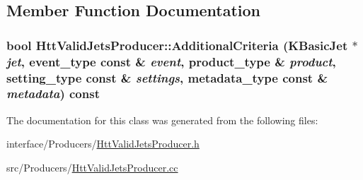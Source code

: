 \subsection{Member Function Documentation}
\hypertarget{classHttValidJetsProducer_a368f84a43f5e68388b5eee1a9d6670d4}{
\subsubsection[{AdditionalCriteria}]{\setlength{\rightskip}{0pt plus 5cm}bool HttValidJetsProducer::AdditionalCriteria (KBasicJet $\ast$ {\em jet}, \/  {\bf event\_\-type} const \& {\em event}, \/  {\bf product\_\-type} \& {\em product}, \/  {\bf setting\_\-type} const \& {\em settings}, \/  {\bf metadata\_\-type} const \& {\em metadata}) const}}
\label{classHttValidJetsProducer_a368f84a43f5e68388b5eee1a9d6670d4}


The documentation for this class was generated from the following files:\begin{DoxyCompactItemize}
\item 
interface/Producers/\hyperlink{HttValidJetsProducer_8h}{HttValidJetsProducer.h}\item 
src/Producers/\hyperlink{HttValidJetsProducer_8cc}{HttValidJetsProducer.cc}\end{DoxyCompactItemize}
